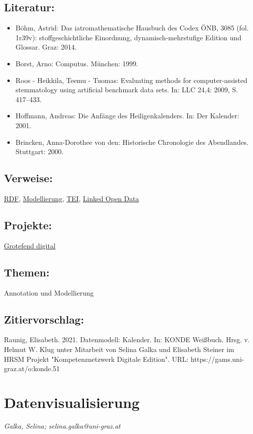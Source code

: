 \documentclass{article}
\begin{document}
        \subsection*{Literatur:}\begin{itemize}\item Böhm, Astrid: Das iatromathematische Hausbuch des Codex ÖNB, 3085
                              (fol. 1r39v): stoffgeschichtliche Einordnung, dynamisch-mehrstufige
                              Edition und Glossar. Graz: 2014.\item Borst, Arno: Computus. München: 1999.\item Roos - Heikkila, Teemu - Tuomas: Evaluating methods for computer-assisted stemmatology
                              using artificial benchmark data sets. In: LLC 24,4: 2009, S. 417–433.\item Hoffmann, Andreas: Die Anfänge des Heiligenkalenders. In: Der Kalender: 2001.\item Brincken, Anna-Dorothee von den: Historische Chronologie des Abendlandes. Stuttgart: 2000.\end{itemize}\subsection*{Verweise:}\href{https://gams.uni-graz.at/o:konde.131}{RDF}, \href{https://gams.uni-graz.at/o:konde.137}{Modellierung}, \href{https://gams.uni-graz.at/o:konde.178}{TEI}, \href{https://gams.uni-graz.at/o:konde.8}{Linked Open Data}\subsection*{Projekte:}\href{https://gams.uni-graz.at/grotefend}{Grotefend digital}\subsection*{Themen:}Annotation und Modellierung\subsection*{Zitiervorschlag:}Raunig, Elisabeth. 2021. Datenmodell: Kalender. In: KONDE Weißbuch. Hrsg. v. Helmut W. Klug unter Mitarbeit von Selina Galka und Elisabeth Steiner im HRSM Projekt "Kompetenznetzwerk Digitale Edition". URL: https://gams.uni-graz.at/o:konde.51\newpage\section*{Datenvisualisierung} \emph{Galka, Selina; selina.galka@uni-graz.at }\\
        
\end{document}
